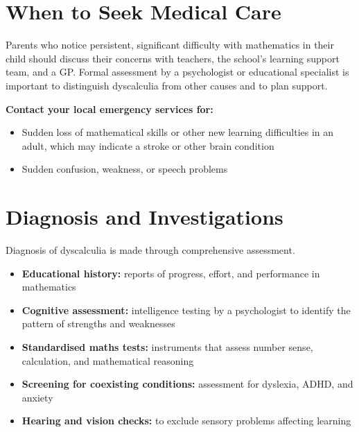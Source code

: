 \section*{When to Seek Medical Care}
Parents who notice persistent, significant difficulty with mathematics in their child should discuss their concerns with teachers, the school's learning support team, and a GP. Formal assessment by a psychologist or educational specialist is important to distinguish dyscalculia from other causes and to plan support.

\textbf{Contact your local emergency services for:}
\begin{itemize}
    \item Sudden loss of mathematical skills or other new learning difficulties in an adult, which may indicate a stroke or other brain condition
    \item Sudden confusion, weakness, or speech problems
\end{itemize}

\section*{Diagnosis and Investigations}
Diagnosis of dyscalculia is made through comprehensive assessment.
\begin{itemize}
    \item \textbf{Educational history:} reports of progress, effort, and performance in mathematics
    \item \textbf{Cognitive assessment:} intelligence testing by a psychologist to identify the pattern of strengths and weaknesses
    \item \textbf{Standardised maths tests:} instruments that assess number sense, calculation, and mathematical reasoning
    \item \textbf{Screening for coexisting conditions:} assessment for dyslexia, ADHD, and anxiety
    \item \textbf{Hearing and vision checks:} to exclude sensory problems affecting learning
\end{itemize}

